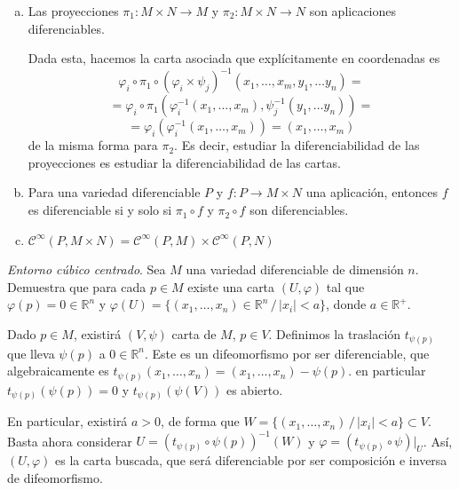 \begin{ejer}
\begin{enumerate}[a)]
\begin{sol}
            Esta es la estructura diferenciable usual en la variedad producto.
        \end{sol}
        \item  Las proyecciones $\pi_1 : M \times N \to M$ y $\pi_2 : M \times N \to N$ son aplicaciones diferenciables.
        \begin{sol}
            Dada esta, hacemos la carta asociada que expl\'icitamente en coordenadas es 
            $$\varphi_i \circ \pi_1 \circ (\varphi_i \times \psi_j)^{-1} (x_1, \ldots, x_m , y_1, \ldots y_n)= $$ $$= \varphi_i \circ \pi_1 (\varphi_i^{-1}(x_1, \ldots, x_m), \psi_j^{-1}(y_1, \ldots y_n)) =$$ $$=\varphi_i\left( \varphi_i^{-1}(x_1, \ldots, x_m)\right) = (x_1, \ldots, x_m)$$
            de la misma forma para $\pi_2$. Es decir, estudiar la diferenciabilidad de las proyecciones es estudiar la diferenciabilidad de las cartas. 
        \end{sol}
        \item Para una variedad diferenciable $P$ y $f : P \to M \times N$ una aplicaci\'on, entonces $f$ es diferenciable si y solo si $\pi_1 \circ f$ y $\pi_2 \circ f$ son diferenciables.
        \item $\mathcal C^{\infty}(P, M \times N) =\mathcal C^{\infty}(P, M) \times \mathcal C^{\infty}(P, N)$
    \end{enumerate}
    
\end{ejer}
\begin{ejer}
    [1.14] \textit{Entorno c\'ubico centrado}. Sea $M$ una variedad diferenciable de dimensi\'on $n$. Demuestra que para cada $p \in M$ existe una carta $(U, \varphi)$ tal que $\varphi(p) = 0 \in \mathbb R^n$ y $\varphi(U) = \{(x_1, \ldots , x_n) \in \mathbb R^n \, / \, |x_i| < a\}$, donde $a \in 
\mathbb R^+$.
\end{ejer}
\begin{sol}
    Dado $p \in M$, existir\'a $(V,\psi)$ carta de $M$, $p \in V$. Definimos la traslaci\'on $t_{\psi(p)}$ que lleva $\psi(p)$ a $0 \in \mathbb R^n$. Este es un difeomorfismo por ser diferenciable, que algebraicamente es $t_{\psi(p)} (x_1, \ldots , x_n) = (x_1, \ldots , x_n) - \psi(p)$. en particular $t_{\psi(p)}(\psi(p)) = 0$ y $t_{\psi(p)}(\psi(V))$ es abierto.

    En particular, existir\'a $a > 0$, de forma que $W=\{(x_1, \ldots , x_n) \, / \, |x_i| < a\} \subset V$. Basta ahora considerar $U=(t_{\psi(p)} \circ \psi(p))^{-1} (W)$ y $\varphi = (t_{\psi(p)} \circ \psi)|_U$. As\'i, $(U, \varphi)$ es la carta buscada, que ser\'a diferenciable por ser composici\'on e inversa de difeomorfismo. 
\end{sol}
